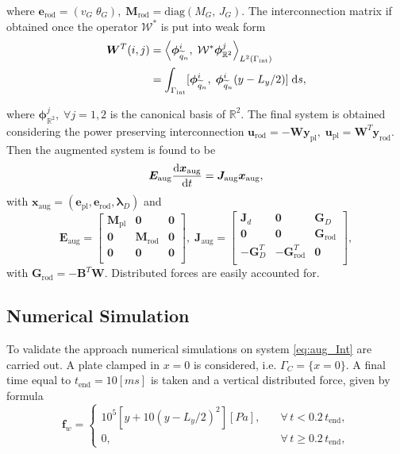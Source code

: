 \documentclass[letterpaper, 10 pt, conference]{ieeeconf}
\begin{document}
where $\bm{e}_{\text{rod}} = (v_G\; \theta_{G}), \; \bm{M}_{\text{rod}} = \mathrm{diag}(M_G, \, J_G)$. The interconnection matrix if obtained once the operator $\mathcal{W}^*$ is put into weak form
\begin{align*}
\bm{W}^T(i,j) &= \left\langle \bm{\phi}^i_{\widetilde{q}_n}, \; \mathcal{W}^* \bm{\phi}^j_{\mathbb{R}^2} \right\rangle_{L^2(\Gamma_{\text{int}})} \\
&= \int_{\Gamma_{\text{int}}} [\bm{\phi}^i_{\widetilde{q}_n}, \; \bm{\phi}^i_{\widetilde{q}_n} (y - L_y/2) ]\d{s},
\end{align*}

where $\bm{\phi}^j_{\mathbb{R}^2},  \; \forall j = 1,2$ is the canonical basis of $\mathbb{R}^2$. The final system is obtained considering the power preserving interconnection $\bm{u}_{\text{rod}} = - \bm{W} \bm{y}_{\text{pl}}, \; \bm{u}_{\text{pl}} = \bm{W}^T \bm{y}_{\text{rod}}$. Then the augmented system is found to be
\begin{equation}
\bm{E}_{\text{aug}} \diff{\bm{x}_{\text{aug}}}{t} = \bm{J}_{\text{aug}}\bm{x}_{\text{aug}}, 
\end{equation}
with $\bm{x}_{\text{aug}} = (\bm{e}_{\text{pl}}, \bm{e}_{\text{rod}}, \bm{\lambda}_D)$ and
\begin{equation}
\label{eq:aug_Int}
\bm{E}_{\text{aug}} = 
\begin{bmatrix}
\bm{M}_{\text{pl}} & \bm{0} & \bm{0} \\
\bm{0} & \bm{M}_{\text{rod}} &\bm{0} \\
\bm{0} & \bm{0} &\bm{0} \\
\end{bmatrix}, \;
\bm{J}_{\text{aug}}=\begin{bmatrix}
\bm{J}_d & \bm{0} & \bm{G}_D \\
\bm{0} & \bm{0} & \bm{G}_{\text{rod}}\\
-\bm{G}_D^T & -\bm{G}_{\text{rod}}^T & \bm{0} \\
\end{bmatrix},
\end{equation}
with $\bm{G}_{\text{rod}} = -\bm{B}^T\bm{W}$. Distributed forces are easily accounted for. 
 
\subsection{Numerical Simulation}
To validate the approach numerical simulations on system \eqref{eq:aug_Int} are carried out. A  plate clamped in $x=0$ is considered, i.e. $\Gamma_C = \{x = 0\}$. A final time equal to $t_{\text{end}} = 10 [ms]$ is taken and a vertical distributed force, given by formula
\begin{equation}\label{eq:force_rod}
\bm{f}_w = \begin{cases}
10^5 \left[ y + 10 \left( y - L_y/2 \right)^2 \right] [Pa], \quad &\forall \, t < 0.2 \, t_{\text{end}}, \\
0, \quad &\forall \, t \ge 0.2 \, t_{\text{end}},
\end{cases}
\end{equation}
\end{document}
